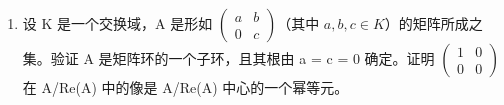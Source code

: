 \begin{enumerate}
\def\labelenumi{\arabic{enumi})}
\setcounter{enumi}{30}
\tightlist
\item
  设 K 是一个交换域，A 是形如 \(\begin{pmatrix} a & b \\ 0 & c \end{pmatrix}\)（其中 \(a, b, c \in K\)）的矩阵所成之集。验证 A 是矩阵环的一个子环，且其根由 a = c = 0 确定。证明 \(\begin{pmatrix} 1 & 0 \\ 0 & 0 \end{pmatrix}\) 在 A/Re(A) 中的像是 A/Re(A) 中心的一个幂等元。
\end{enumerate}


